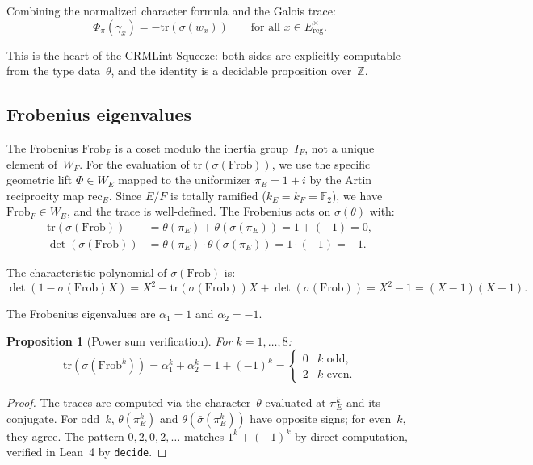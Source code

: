 \documentclass[11pt]{article}
\theoremstyle{plain}
\newtheorem{proposition}[theorem]{Proposition}
\theoremstyle{definition}
\theoremstyle{remark}
\newcommand{\Z}{\mathbb{Z}}
\newcommand{\F}{\mathbb{F}}
\newcommand{\Frob}{\mathrm{Frob}}
\newcommand{\tr}{\mathrm{tr}}
\newcommand{\rec}{\mathrm{rec}}
\newcommand{\Phipi}{\Phi_\pi}
\begin{document}
Combining the normalized character formula and the Galois trace:
\[
  \boxed{\Phipi(\gamma_x) = -\tr(\sigma(w_x))}
  \qquad \text{for all } x \in E^\times_{\mathrm{reg}}.
\]

This is the heart of the CRMLint Squeeze: both sides are
explicitly computable from the type data~$\theta$, and the
identity is a decidable proposition over~$\Z$.

\subsection{Frobenius eigenvalues}

The Frobenius $\Frob_F$ is a coset modulo the inertia
group~$I_F$, not a unique element of~$W_F$.  For the evaluation
of $\tr(\sigma(\Frob))$, we use the specific geometric lift
$\Phi \in W_E$ mapped to the uniformizer $\pi_E = 1+i$ by the
Artin reciprocity map $\rec_E$.  Since $E/F$ is totally
ramified ($k_E = k_F = \F_2$), we have $\Frob_F \in W_E$, and
the trace is well-defined.  The Frobenius acts on
$\sigma(\theta)$ with:
\begin{align*}
  \tr(\sigma(\Frob)) &= \theta(\pi_E) + \theta(\bar\sigma(\pi_E))
  = 1 + (-1) = 0, \\
  \det(\sigma(\Frob)) &= \theta(\pi_E) \cdot
  \theta(\bar\sigma(\pi_E)) = 1 \cdot (-1) = -1.
\end{align*}

The characteristic polynomial of $\sigma(\Frob)$ is:
\[
  \det(1 - \sigma(\Frob) X)
  = X^2 - \tr(\sigma(\Frob)) X + \det(\sigma(\Frob))
  = X^2 - 1 = (X-1)(X+1).
\]

The Frobenius eigenvalues are $\alpha_1 = 1$ and $\alpha_2 = -1$.

\begin{proposition}[Power sum verification]\label{prop:power}
For $k = 1, \ldots, 8$:
\[
  \tr(\sigma(\Frob^k)) = \alpha_1^k + \alpha_2^k
  = 1 + (-1)^k
  = \begin{cases} 0 & k \text{ odd}, \\ 2 & k \text{ even}. \end{cases}
\]
\end{proposition}
\begin{proof}
The traces are computed via the character~$\theta$ evaluated
at $\pi_E^k$ and its conjugate.  For odd~$k$,
$\theta(\pi_E^k)$ and $\theta(\bar\sigma(\pi_E^k))$ have
opposite signs; for even~$k$, they agree.  The pattern
$0, 2, 0, 2, \ldots$ matches $1^k + (-1)^k$ by direct
computation, verified in Lean~4 by \texttt{decide}.
\end{proof}
\end{document}

